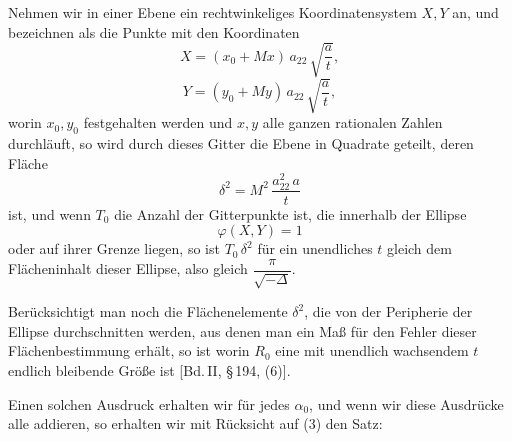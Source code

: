 Nehmen wir in einer Ebene ein rechtwinkeliges Koordinatensystem
 $X, Y$ an, und bezeichnen als  die Punkte
mit den Koordinaten
\[
X = (x_0 + Mx)\, a_{22}\, \sqrt{\dfrac{a}{t}},
\]
\[
Y = (y_0 + My)\, a_{22}\, \sqrt{\dfrac{a}{t}},
\]
worin $x_0, y_0$ festgehalten werden und $x, y$ alle ganzen rationalen
Zahlen durchläuft, so wird durch dieses Gitter die Ebene in
Quadrate geteilt, deren Fläche
\[
\delta^2 = M^2\, \dfrac{a_{22}^2\, a}{t}
\]
ist, und wenn $T_0$ die Anzahl der Gitterpunkte ist, die innerhalb
der Ellipse
\[
\varphi(X, Y) = 1
\]
oder auf ihrer Grenze liegen, so ist $T_0\,\delta^2$ für ein unendliches $t$
gleich dem Flächeninhalt dieser Ellipse, also gleich $\dfrac{\pi}{\sqrt{-\Delta}}$.

Berücksichtigt man noch die Flächenelemente $\delta^2$, die von der
Peripherie der Ellipse durchschnitten werden, aus denen man ein
Maß für den Fehler dieser Flächenbestimmung erhält, so ist
worin $R_0$ eine mit unendlich wachsendem $t$ endlich bleibende
Größe ist [Bd.\,II, \S\,194, (6)].

Einen solchen Ausdruck erhalten wir für jedes $\alpha_0$, und wenn
wir diese Ausdrücke alle addieren, so erhalten wir mit Rücksicht
auf (3) den Satz:

